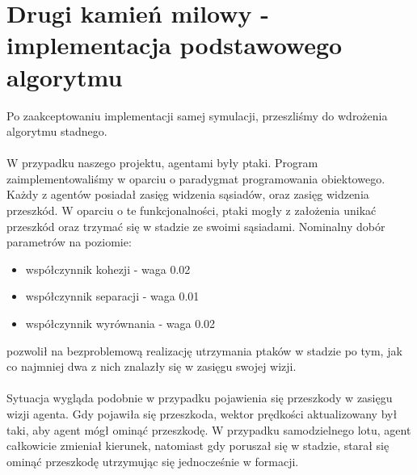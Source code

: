\documentclass[a4paper,12pt]{article}
\begin{document}
\section{Drugi kamień milowy - implementacja podstawowego algorytmu}
Po zaakceptowaniu implementacji samej symulacji, przeszliśmy do wdrożenia algorytmu stadnego. \\\\
W przypadku naszego projektu, agentami były ptaki. Program zaimplementowaliśmy w oparciu o paradygmat programowania obiektowego. Każdy z agentów posiadał zasięg widzenia sąsiadów, oraz zasięg widzenia przeszkód. W oparciu o te funkcjonalności, ptaki mogły z założenia unikać przeszkód oraz trzymać się w stadzie ze swoimi sąsiadami. Nominalny dobór parametrów na poziomie:
\begin{itemize}
    \item współczynnik kohezji - waga 0.02
    \item współczynnik separacji - waga 0.01
    \item współczynnik wyrównania - waga 0.02
\end{itemize}
pozwolił na bezproblemową realizację utrzymania ptaków w stadzie po tym, jak co najmniej dwa z nich znalazły się w zasięgu swojej wizji.\\\\
Sytuacja wygląda podobnie w przypadku pojawienia się przeszkody w zasięgu wizji agenta. Gdy pojawiła się przeszkoda, wektor prędkości aktualizowany był taki, aby agent mógł ominąć przeszkodę. W przypadku samodzielnego lotu, agent całkowicie zmieniał kierunek, natomiast gdy poruszał się w stadzie, starał się ominąć przeszkodę utrzymując się jednocześnie w formacji.
\end{document}
